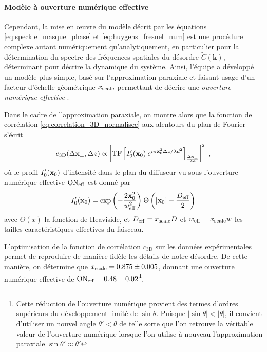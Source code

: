 \paragraph*{Modèle à ouverture numérique effective}
Cependant, la mise en œuvre du modèle décrit par les équations \ref{eq:speckle_masque_phase} et \ref{eq:huygens_fresnel_num} est une procédure complexe autant numériquement qu'analytiquement, en particulier pour la détermination du spectre des fréquences spatiales du désordre $\widetilde{C}(\mathbf{k})$, déterminant pour décrire la dynamique du système. Ainsi, l'équipe a développé un modèle plus simple, basé sur l'approximation paraxiale et faisant usage d'un facteur d'échelle géométrique $x_{\mathrm{scale}}$ permettant de décrire une \emph{ouverture numérique effective} \citep{richard2019elastic}.

Dans le cadre de l'approximation paraxiale, on montre alors que la fonction de corrélation \ref{eq:correlation_3D_normalisee} aux alentours du plan de Fourier s'écrit
\begin{equation}
c_{\mathrm{3D}}(\Delta \mathbf{x}_\perp, \Delta z) \propto \left| \mathrm{TF} \left[ I_0'(\mathbf{x}_0) \: e^{i \pi \mathbf{x}_0^2 \Delta z /\lambda d^2} \right]_{\frac{\Delta \mathbf{x}_\perp}{\lambda d}} \right|^2 \text{ ,}
\label{eq:correlation_3D_paraxial_effectif}
\end{equation}
où le profil $I_0'(\mathbf{x}_0)$ d'intensité dans le plan du diffuseur vu sous l'ouverture numérique effective $\mathrm{ON}_{\mathrm{eff}}$ est donné par
\begin{equation}
I_0'(\mathbf{x}_0)= \exp{\left( -\frac{2 \mathbf{x}_0^2}{w_{\mathrm{eff}}^2} \right)} \: \Theta \left( \left| \mathbf{x}_0 \right|- \frac{D_{\mathrm{eff}}}{2} \right)
\label{eq:profil_intensite_diffuseur}
\end{equation}
avec $\Theta(x)$ la fonction de Heaviside, et $D_{\mathrm{eff}}=x_{\mathrm{scale}} D$ et $w_{\mathrm{eff}}=x_{\mathrm{scale}} w$ les tailles caractéristiques effectives du faisceau. 

L'optimisation de la fonction de corrélation $c_{\mathrm{3D}}$ sur les données expérimentales permet de reproduire de manière fidèle les détails de notre désordre. De cette manière, on détermine que $x_{\mathrm{scale}}=0.875\pm0.005$, donnant une ouverture numérique effective de $\mathrm{ON}_{\mathrm{eff}}=0.48\pm0.02$\footnote{Cette réduction de l'ouverture numérique provient des termes d'ordres supérieurs du développement limité de $\sin{\theta}$. Puisque $\left| \sin{\theta} \right|<\left|\theta\right|$, il convient d'utiliser un nouvel angle $\theta'<\theta$ de telle sorte que l'on retrouve la véritable valeur de l'ouverture numérique lorsque l'on utilise à nouveau l'approximation paraxiale $\sin{\theta'} \approx \theta'$}.



